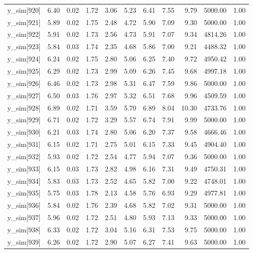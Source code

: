 \begin{table}[ht]
\begin{tabular}{rrrrrrrrrrr}
  y\_sim[920] & 6.40 & 0.02 & 1.72 & 3.06 & 5.23 & 6.41 & 7.55 & 9.79 & 5000.00 & 1.00 \\ 
  y\_sim[921] & 5.89 & 0.02 & 1.75 & 2.48 & 4.72 & 5.90 & 7.09 & 9.30 & 5000.00 & 1.00 \\ 
  y\_sim[922] & 5.91 & 0.02 & 1.73 & 2.56 & 4.73 & 5.91 & 7.07 & 9.34 & 4814.26 & 1.00 \\ 
  y\_sim[923] & 5.84 & 0.03 & 1.74 & 2.35 & 4.68 & 5.86 & 7.00 & 9.21 & 4488.32 & 1.00 \\ 
  y\_sim[924] & 6.24 & 0.02 & 1.75 & 2.80 & 5.06 & 6.25 & 7.40 & 9.72 & 4950.42 & 1.00 \\ 
  y\_sim[925] & 6.29 & 0.02 & 1.73 & 2.99 & 5.09 & 6.26 & 7.45 & 9.68 & 4997.18 & 1.00 \\ 
  y\_sim[926] & 6.46 & 0.02 & 1.73 & 2.98 & 5.31 & 6.47 & 7.59 & 9.86 & 5000.00 & 1.00 \\ 
  y\_sim[927] & 6.50 & 0.03 & 1.76 & 2.97 & 5.32 & 6.51 & 7.68 & 9.96 & 4509.59 & 1.00 \\ 
  y\_sim[928] & 6.89 & 0.02 & 1.71 & 3.59 & 5.70 & 6.89 & 8.04 & 10.30 & 4733.76 & 1.00 \\ 
  y\_sim[929] & 6.71 & 0.02 & 1.72 & 3.29 & 5.57 & 6.74 & 7.91 & 9.99 & 5000.00 & 1.00 \\ 
  y\_sim[930] & 6.21 & 0.03 & 1.74 & 2.80 & 5.06 & 6.20 & 7.37 & 9.58 & 4666.46 & 1.00 \\ 
  y\_sim[931] & 6.15 & 0.02 & 1.71 & 2.75 & 5.01 & 6.15 & 7.33 & 9.45 & 4904.40 & 1.00 \\ 
  y\_sim[932] & 5.93 & 0.02 & 1.72 & 2.54 & 4.77 & 5.94 & 7.07 & 9.36 & 5000.00 & 1.00 \\ 
  y\_sim[933] & 6.15 & 0.03 & 1.73 & 2.82 & 4.98 & 6.16 & 7.31 & 9.49 & 4750.31 & 1.00 \\ 
  y\_sim[934] & 5.83 & 0.03 & 1.73 & 2.52 & 4.65 & 5.82 & 7.00 & 9.22 & 4748.01 & 1.00 \\ 
  y\_sim[935] & 5.75 & 0.03 & 1.78 & 2.13 & 4.58 & 5.76 & 6.93 & 9.29 & 4977.81 & 1.00 \\ 
  y\_sim[936] & 5.84 & 0.02 & 1.76 & 2.39 & 4.68 & 5.82 & 7.02 & 9.31 & 5000.00 & 1.00 \\ 
  y\_sim[937] & 5.96 & 0.02 & 1.72 & 2.51 & 4.80 & 5.93 & 7.13 & 9.33 & 5000.00 & 1.00 \\ 
  y\_sim[938] & 6.33 & 0.02 & 1.72 & 3.04 & 5.16 & 6.31 & 7.53 & 9.75 & 5000.00 & 1.00 \\ 
  y\_sim[939] & 6.26 & 0.02 & 1.72 & 2.90 & 5.07 & 6.27 & 7.41 & 9.63 & 5000.00 & 1.00 \\ 

\end{tabular}
\end{table}
